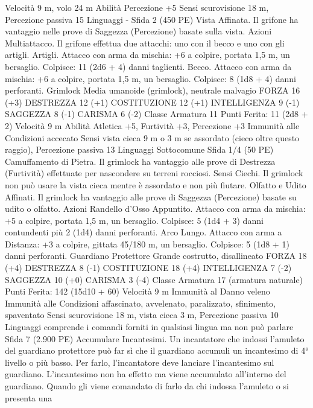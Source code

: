 \begin{multicols}{2}
Velocità 9 m, volo 24 m
Abilità Percezione +5
Sensi scurovisione 18 m, Percezione passiva 15
Linguaggi -
Sfida 2 (450 PE)
Vista Affinata. Il grifone ha vantaggio nelle prove di Saggezza
(Percezione) basate sulla vista.
Azioni
Multiattacco. Il grifone effettua due attacchi: uno con il becco e
uno con gli artigli.
Artigli. Attacco con arma da mischia: +6 a colpire, portata 1,5
m, un bersaglio.
Colpisce: 11 (2d6 + 4) danni taglienti.
Becco. Attacco con arma da mischia: +6 a colpire, portata 1,5 m,
un bersaglio.
Colpisce: 8 (1d8 + 4) danni perforanti.
Grimlock
Media umanoide (grimlock), neutrale malvagio
FORZA 16 (+3)
DESTREZZA 12 (+1)
COSTITUZIONE 12 (+1)
INTELLIGENZA 9 (-1)
SAGGEZZA 8 (-1)
CARISMA 6 (-2)
Classe Armatura 11
\hspace*{0pt}\hfill{Punti Ferita}: 11 (2d8 + 2)
Velocità 9 m
Abilità Atletica +5, Furtività +3, Percezione +3
Immunità alle Condizioni accecato
Sensi vista cieca 9 m o 3 m se assordato (cieco oltre questo
raggio), Percezione passiva 13
Linguaggi Sottocomune
Sfida 1/4 (50 PE)
Camuffamento di Pietra. Il grimlock ha vantaggio alle prove di
Destrezza (Furtività) effettuate per nascondere su terreni
rocciosi.
Sensi Ciechi. Il grimlock non può usare la vista cieca mentre è
assordato e non più fiutare.
Olfatto e Udito Affinati. Il grimlock ha vantaggio alle prove di
Saggezza (Percezione) basate su udito o olfatto.
Azioni
Randello d’Osso Appuntito. Attacco con arma da mischia: +5 a
colpire, portata 1,5 m, un bersaglio.
Colpisce: 5 (1d4 + 3) danni contundenti più 2 (1d4) danni
perforanti.
Arco Lungo. Attacco con arma a Distanza: +3 a colpire, gittata
45/180 m, un bersaglio.
Colpisce: 5 (1d8 + 1) danni perforanti.
Guardiano Protettore
Grande costrutto, disallineato
FORZA 18 (+4)
DESTREZZA 8 (-1)
COSTITUZIONE 18 (+4)
INTELLIGENZA 7 (-2)
SAGGEZZA 10 (+0)
CARISMA 3 (-4)
Classe Armatura 17 (armatura naturale)
\hspace*{0pt}\hfill{Punti Ferita}: 142 (15d10 + 60)
Velocità 9 m
Immunità al Danno veleno
Immunità alle Condizioni affascinato, avvelenato, paralizzato,
sfinimento, spaventato
Sensi scurovisione 18 m, vista cieca 3 m, Percezione passiva 10
Linguaggi comprende i comandi forniti in qualsiasi lingua ma
non può parlare
Sfida 7 (2.900 PE)
Accumulare Incantesimi. Un incantatore che indossi l’amuleto del
guardiano protettore può far sì che il guardiano accumuli un
incantesimo di 4° livello o più basso. Per farlo, l’incantatore deve
lanciare l’incantesimo sul guardiano. L’incantesimo non ha effetto
ma viene accumulato all’interno del guardiano. Quando gli viene
comandato di farlo da chi indossa l’amuleto o si presenta una

\end{multicols}

